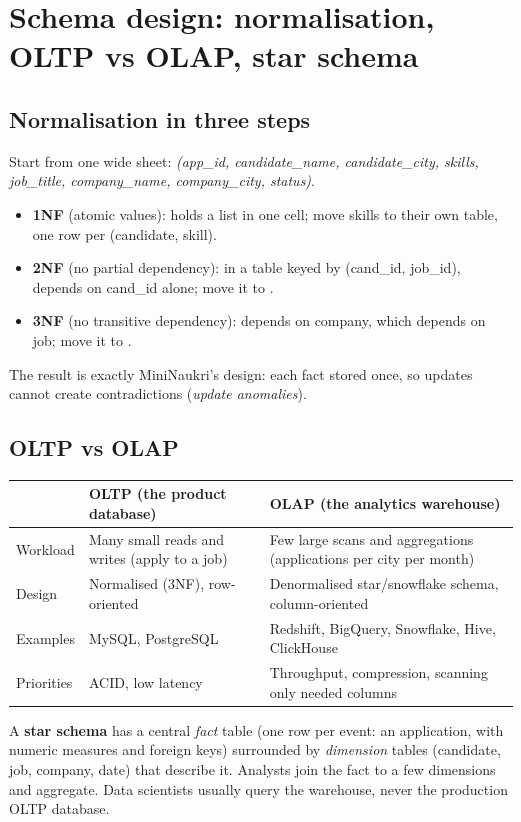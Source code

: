 \section{Schema design: normalisation, OLTP vs OLAP, star schema}
\subsection{Normalisation in three steps}
Start from one wide sheet: \emph{(app\_id, candidate\_name, candidate\_city, skills, job\_title, company\_name, company\_city, status)}.
\begin{itemize}
\item \textbf{1NF} (atomic values):  holds a list in one cell; move skills to their own table, one row per (candidate, skill).
\item \textbf{2NF} (no partial dependency): in a table keyed by (cand\_id, job\_id),  depends on cand\_id alone; move it to
.
\item \textbf{3NF} (no transitive dependency):  depends on company, which depends on job; move it to .
\end{itemize}
The result is exactly MiniNaukri's design: each fact stored once, so updates cannot create contradictions (\emph{update anomalies}).

\subsection{OLTP vs OLAP}
\begin{center}\small
\begin{tabularx}{\linewidth}{l X X}
\toprule
& OLTP (the product database) & OLAP (the analytics warehouse)\\
\midrule
Workload & Many small reads and writes (apply to a job) & Few large scans and aggregations (applications per city per month)\\
Design & Normalised (3NF), row-oriented & Denormalised star/snowflake schema, column-oriented\\
Examples & MySQL, PostgreSQL & Redshift, BigQuery, Snowflake, Hive, ClickHouse\\
Priorities & ACID, low latency & Throughput, compression, scanning only needed columns\\
\bottomrule
\end{tabularx}
\end{center}
A \textbf{star schema} has a central \emph{fact} table (one row per event: an application, with numeric measures and foreign keys) surrounded by
\emph{dimension} tables (candidate, job, company, date) that describe it. Analysts join the fact to a few dimensions and aggregate. Data scientists usually
query the warehouse, never the production OLTP database.

